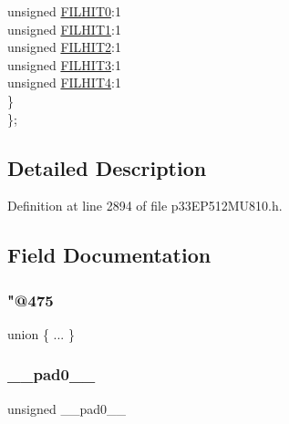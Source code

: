 \begin{DoxyCompactItemize}
\begin{tabbing}
\>\>unsigned \hyperlink{structtag_c1_v_e_c_b_i_t_s_adcc02c6f556be9929ff23762437c4dfa}{FILHIT0}:1\\
\>\>unsigned \hyperlink{structtag_c1_v_e_c_b_i_t_s_a4ea961262bcbb993390a2c5fb0ec3441}{FILHIT1}:1\\
\>\>unsigned \hyperlink{structtag_c1_v_e_c_b_i_t_s_a8221a8d8d3f31d4ef70bdb8237c90e9d}{FILHIT2}:1\\
\>\>unsigned \hyperlink{structtag_c1_v_e_c_b_i_t_s_a6442e8f609be4a3f77dd883dcfaa9cb7}{FILHIT3}:1\\
\>\>unsigned \hyperlink{structtag_c1_v_e_c_b_i_t_s_ad6ae57defca18f986f3234469312ddb1}{FILHIT4}:1\\
\>\} \\
\}; \\

\end{tabbing}\end{DoxyCompactItemize}


\subsection{Detailed Description}


Definition at line 2894 of file p33\+E\+P512\+M\+U810.\+h.



\subsection{Field Documentation}
\mbox{\label{structtag_c1_v_e_c_b_i_t_s_a148b3f184415990af16fe0bd5db30c2c}} 
\subsubsection{\texorpdfstring{"@475}{@475}}
{\footnotesize\ttfamily union \{ ... \} }

\mbox{\label{structtag_c1_v_e_c_b_i_t_s_adf71f3d8410c1f1dbbc96680a92c49af}} 
\subsubsection{\texorpdfstring{\+\_\+\+\_\+pad0\+\_\+\+\_\+}{\_\_pad0\_\_}}
{\footnotesize\ttfamily unsigned \+\_\+\+\_\+pad0\+\_\+\+\_\+}



